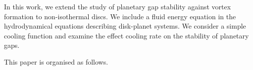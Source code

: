 \documentclass[useAMS,usenatbib]{mn2e}
\begin{document}
In this work, we extend the study of planetary gap stability against vortex formation to non-isothermal discs. 
We include a fluid energy equation in the hydrodynamical equations describing disk-planet systems. We consider a simple
cooling function and examine the effect cooling rate on the stability of planetary gaps. 

This paper is organised as follows. 





%
%





\appendix
%
%
\end{document}
